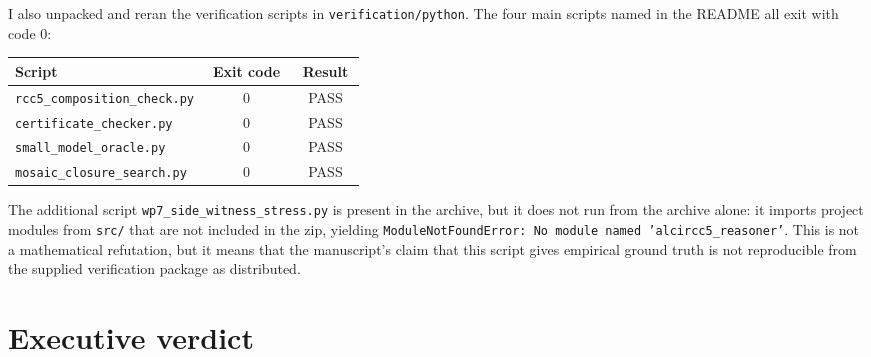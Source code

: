 \documentclass[11pt]{article}
\begin{document}
I also unpacked and reran the verification scripts in
\texttt{verification/python}.  The four main scripts named in the README all
exit with code 0:
\begin{center}
\begin{tabular}{p{0.55\linewidth}cc}
\toprule
Script & Exit code & Result \\
\midrule
\texttt{rcc5\_composition\_check.py} & 0 & PASS \\
\texttt{certificate\_checker.py} & 0 & PASS \\
\texttt{small\_model\_oracle.py} & 0 & PASS \\
\texttt{mosaic\_closure\_search.py} & 0 & PASS \\
\bottomrule
\end{tabular}
\end{center}
The additional script \texttt{wp7\_side\_witness\_stress.py} is present in the
archive, but it does not run from the archive alone: it imports project modules
from \texttt{src/} that are not included in the zip, yielding
\texttt{ModuleNotFoundError: No module named 'alcircc5\_reasoner'}.  This is not
a mathematical refutation, but it means that the manuscript's claim that this
script gives empirical ground truth is not reproducible from the supplied
verification package as distributed.

\section{Executive verdict}
\end{document}
